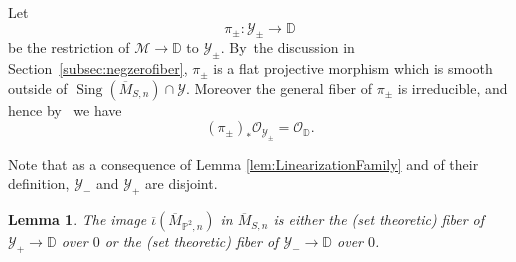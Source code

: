 \documentclass[JEP,XML,SOM,Unicode,published]{cedram}
\newcommand{\DD}{{\mathbb D}}
\newcommand{\PP}{{\mathbb P}}\let\P\PP
\newcommand\cM{\mathcal{M}}
\newcommand\cO{\mathcal{O}}
\newcommand\cY{\mathcal{Y}}
\DeclareMathOperator{\Sing}{Sing}
\let\ov\overline
\newtheorem{lemm}{Lemma}[section]
\theoremstyle{definition}
\def\citestacks#1{\cite[\href{https://stacks.math.columbia.edu/tag/#1}{Tag #1}]{stacks-project}}
\begin{document}
Let
\begin{equation}\label{eq:FixedFamilyFlat}
\pi_{\pm}\colon \cY_{\pm} \to \DD
\end{equation}
be the restriction of $\cM\to\DD$ to $\cY_{\pm}$. By~the discussion in Section~\ref{subsec:negzerofiber}, $\pi_{\pm}$ is a flat projective morphism which is smooth outside of $\Sing(\overline{M}_{S,n})\cap \cY$.
Moreover the general fiber of $\pi_{\pm}$ is irreducible, and hence by~\citestacks{0AY8} we have
\begin{equation}\label{pushstruct}
\left(\pi_{\pm}\right)_*\cO_{\cY_{\pm}}=\cO_{\DD}.
\end{equation}

Note that as a consequence of Lemma \ref{lem:LinearizationFamily} and of their definition, $\cY_-$ and $\cY_+$ are disjoint.

\begin{lemm}\label{lem:tuttasola}
The image $\ov{\iota}(\ov{M}_{\PP^2,n})$ in $\ov{M}_{S,n}$ is either the (set theoretic) fiber of \hbox{$\cY_+\to \DD$} over $0$ or the (set theoretic) fiber of $\cY_-\to \DD$ over $0$.
\end{lemm}
\end{document}
